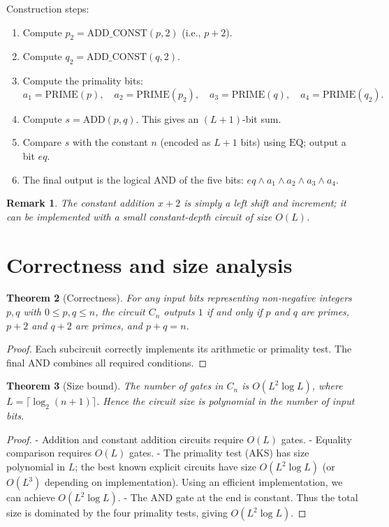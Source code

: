 \documentclass[11pt,a4paper]{article}
\newtheorem{theorem}{Theorem}[section]
\newtheorem{remark}[theorem]{Remark}
\begin{document}
Construction steps:
\begin{enumerate}
\item Compute \(p_2 = \mathrm{ADD\_CONST}(p, 2)\) (i.e., \(p+2\)).
\item Compute \(q_2 = \mathrm{ADD\_CONST}(q, 2)\).
\item Compute the primality bits:
   \[
   a_1 = \mathrm{PRIME}(p),\quad
   a_2 = \mathrm{PRIME}(p_2),\quad
   a_3 = \mathrm{PRIME}(q),\quad
   a_4 = \mathrm{PRIME}(q_2).
   \]
\item Compute \(s = \mathrm{ADD}(p, q)\). This gives an \((L+1)\)-bit sum.
\item Compare \(s\) with the constant \(n\) (encoded as \(L+1\) bits) using \(\mathrm{EQ}\); output a bit \(eq\).
\item The final output is the logical AND of the five bits: \(eq \land a_1 \land a_2 \land a_3 \land a_4\).
\end{enumerate}

\begin{remark}
The constant addition \(x+2\) is simply a left shift and increment; it can be implemented with a small constant‑depth circuit of size \(O(L)\).
\end{remark}

\section{Correctness and size analysis}

\begin{theorem}[Correctness]\label{thm:correct}
For any input bits representing non‑negative integers \(p,q\) with \(0\le p,q \le n\), the circuit \(C_n\) outputs \(1\) if and only if \(p\) and \(q\) are primes, \(p+2\) and \(q+2\) are primes, and \(p+q = n\).
\end{theorem}
\begin{proof}
Each subcircuit correctly implements its arithmetic or primality test. The final AND combines all required conditions.
\end{proof}

\begin{theorem}[Size bound]\label{thm:size}
The number of gates in \(C_n\) is \(O(L^2 \log L)\), where \(L = \lceil \log_2 (n+1)\rceil\). Hence the circuit size is polynomial in the number of input bits.
\end{theorem}
\begin{proof}
- Addition and constant addition circuits require \(O(L)\) gates.
- Equality comparison requires \(O(L)\) gates.
- The primality test (AKS) has size polynomial in \(L\); the best known explicit circuits have size \(O(L^2 \log L)\) (or \(O(L^{3})\) depending on implementation). Using an efficient implementation, we can achieve \(O(L^2 \log L)\).
- The AND gate at the end is constant.
Thus the total size is dominated by the four primality tests, giving \(O(L^2 \log L)\).
\end{proof}
\end{document}
